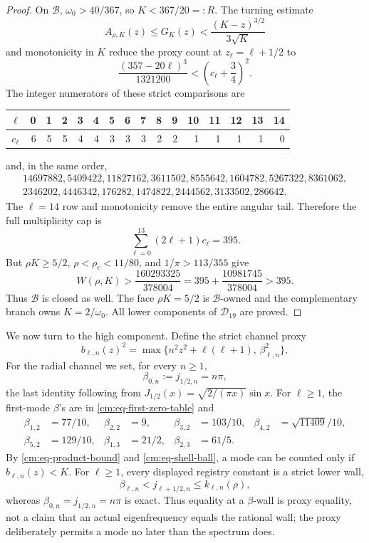 \documentclass[11pt]{article}
\numberwithin{equation}{section}
\theoremstyle{definition}
\theoremstyle{remark}
\begin{document}
\begin{proof}
On \(\mathcal B\), \(\omega_0>40/367\), so \(K<367/20=:R\).  The
turning estimate
\[
 A_{\rho,K}(z)\leq G_K(z)<\frac{(K-z)^{3/2}}{3\sqrt K}
\]
and monotonicity in \(K\) reduce the proxy count at
\(z_\ell=\ell+1/2\) to
\[
 \frac{(357-20\ell)^3}{1321200}
 <\left(c_\ell+\frac34\right)^2.
\]
The integer numerators of these strict comparisons are
\begin{center}
\small
\begin{tabular}{c|rrrrrrrrrrrrrrr}
\(\ell\)&0&1&2&3&4&5&6&7&8&9&10&11&12&13&14\\ \hline
\(c_\ell\)&6&5&5&4&4&3&3&3&2&2&1&1&1&1&0
\end{tabular}
\end{center}
and, in the same order,
\[
\begin{gathered}
14697882,5409422,11827162,3611502,8555642,
1604782,5267322,8361062,\\
2346202,4446342,176282,1474822,2444562,3133502,286642.
\end{gathered}
\]
The \(\ell=14\) row and monotonicity remove the entire angular tail.
Therefore the full multiplicity cap is
\[
 \sum_{\ell=0}^{13}(2\ell+1)c_\ell=395.
\]
But \(\rho K\geq5/2\), \(\rho<\rho_c<11/80\), and
\(1/\pi>113/355\) give
\[
 W(\rho,K)>
 \frac{160293325}{378004}
 =395+\frac{10981745}{378004}>395.
\]
Thus \(\mathcal B\) is closed as well.  The face \(\rho K=5/2\) is
\(\mathcal B\)-owned and the complementary branch owns
\(K=2/\omega_0\).  All lower
components of \(\mathcal D_{19}\) are proved.
\end{proof}

We now turn to the high component.  Define the strict channel proxy
\begin{equation}
 b_{\ell,n}(z)^2=
 \max\{n^2z^2+\ell(\ell+1),\,\beta_{\ell,n}^2\},
 \label{cm:eq-channel-proxy}
\end{equation}
For the radial channel we set, for every \(n\geq1\),
\[
 \beta_{0,n}:=j_{1/2,n}=n\pi,
\]
the last identity following from
\(J_{1/2}(x)=\sqrt{2/(\pi x)}\sin x\).  For \(\ell\geq1\), the
first-mode \(\beta\)'s are in
\eqref{cm:eq-first-zero-table} and
\[
\begin{aligned}
 \beta_{1,2}&=77/10,&
 \beta_{2,2}&=9,&
 \beta_{3,2}&=103/10,&
 \beta_{4,2}&=\sqrt{11409}/10,\\
 \beta_{5,2}&=129/10,&
 \beta_{1,3}&=21/2,&
 \beta_{2,3}&=61/5.
\end{aligned}
\]
By \eqref{cm:eq-product-bound} and \eqref{cm:eq-shell-ball}, a mode can
be counted only if \(b_{\ell,n}(z)<K\).
For \(\ell\geq1\), every displayed registry constant is a strict lower
wall,
\begin{equation}
 \beta_{\ell,n}<j_{\ell+1/2,n}\leq k_{\ell,n}(\rho),
 \label{cm:eq-proxy-versus-zero}
\end{equation}
whereas \(\beta_{0,n}=j_{1/2,n}=n\pi\) is exact.  Thus equality at a
\(\beta\)-wall is proxy equality, not a claim that an actual eigenfrequency
equals the rational wall; the proxy deliberately permits a mode no later
than the spectrum does.
\end{document}

